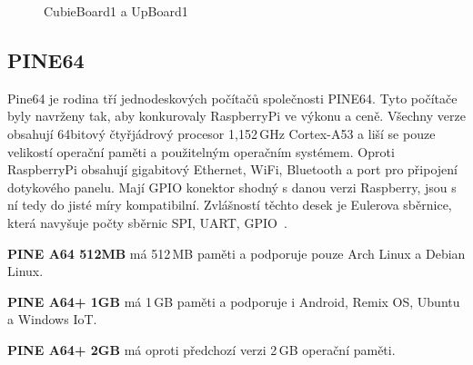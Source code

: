 	\begin{figure}[!ht]
	\vspace{-10pt}	
    \centering
			\hspace*{5mm}
			\caption{CubieBoard1 a UpBoard1}
			\vspace{-10pt}	
\end{figure}
		

	\subsection{PINE64}
Pine64 je rodina tří jednodeskových počítačů společnosti PINE64. Tyto počítače byly navrženy tak, aby konkurovaly RaspberryPi ve výkonu a ceně. Všechny verze obsahují 64bitový čtyřjádrový procesor 1,152\,GHz Cortex-A53 a liší se pouze velikostí operační paměti a použitelným operačním systémem. Oproti RaspberryPi obsahují gigabitový Ethernet, WiFi, Bluetooth a port pro připojení dotykového panelu. Mají GPIO konektor shodný s danou verzi Raspberry, jsou s ní tedy do jisté míry kompatibilní. Zvlášností těchto desek je Eulerova sběrnice, která navyšuje počty sběrnic SPI, UART, GPIO~\cite{Pine64}.

\textbf{PINE A64 512MB} má 512\,MB paměti a podporuje pouze Arch Linux a Debian Linux.

\textbf{PINE A64+ 1GB} má 1\,GB paměti a podporuje i Android, Remix OS, Ubuntu a Windows IoT.

\textbf{PINE A64+ 2GB} má oproti předchozí verzi 2\,GB operační paměti.

